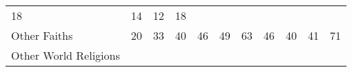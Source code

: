 \documentclass[]{article}
\begin{document}
\begin{longtable}[]{@{}lllllllllll@{}}
\begin{minipage}[t]{0.06\columnwidth}
18\strut
\end{minipage} & \begin{minipage}[t]{0.06\columnwidth}\raggedright\strut
14\strut
\end{minipage} & \begin{minipage}[t]{0.04\columnwidth}\raggedright\strut
12\strut
\end{minipage} & \begin{minipage}[t]{0.11\columnwidth}\raggedright\strut
18\strut
\end{minipage}\tabularnewline
\begin{minipage}[t]{0.14\columnwidth}\raggedright\strut
Other Faiths\strut
\end{minipage} & \begin{minipage}[t]{0.04\columnwidth}\raggedright\strut
20\strut
\end{minipage} & \begin{minipage}[t]{0.05\columnwidth}\raggedright\strut
33\strut
\end{minipage} & \begin{minipage}[t]{0.05\columnwidth}\raggedright\strut
40\strut
\end{minipage} & \begin{minipage}[t]{0.05\columnwidth}\raggedright\strut
46\strut
\end{minipage} & \begin{minipage}[t]{0.05\columnwidth}\raggedright\strut
49\strut
\end{minipage} & \begin{minipage}[t]{0.05\columnwidth}\raggedright\strut
63\strut
\end{minipage} & \begin{minipage}[t]{0.06\columnwidth}\raggedright\strut
46\strut
\end{minipage} & \begin{minipage}[t]{0.06\columnwidth}\raggedright\strut
40\strut
\end{minipage} & \begin{minipage}[t]{0.04\columnwidth}\raggedright\strut
41\strut
\end{minipage} & \begin{minipage}[t]{0.11\columnwidth}\raggedright\strut
71\strut
\end{minipage}\tabularnewline
\begin{minipage}[t]{0.14\columnwidth}\raggedright\strut
Other World Religions\strut
\end{minipage} & \begin{minipage}[t]{0.04\columnwidth}\raggedright\strut

\end{minipage}
\end{longtable}
\end{document}
